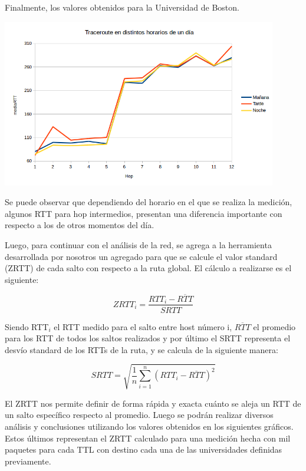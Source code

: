 Finalmente, los valores obtenidos para la Universidad de Boston. 

\centerline{\includegraphics[width=0.9\textwidth]{imagenes/1ra_parte/trace_distintos_horarios_eeuu.png}}

Se puede observar que dependiendo del horario en el que se realiza la medición, algunos RTT para hop intermedios, presentan una diferencia importante con respecto a los de otros momentos del día. 


Luego, para continuar con el análisis de la red, se agrega a la herramienta desarrollada por nosotros un agregado para que se calcule el valor standard (ZRTT) de cada salto con respecto a la ruta global. El cálculo a realizarse es el siguiente:

 \begin{equation}
 	ZRTT_i = \frac{RTT_i - \overline{RTT}}{SRTT} 
 \end{equation}

 Siendo RTT$_{i}$ el RTT medido para el salto entre host número i, $\overline{RTT}$ el promedio para los RTT de todos los saltos realizados y por último el SRTT representa el desvío standard de los RTTs de la ruta, y se calcula de la siguiente manera:

\begin{equation}
 	SRTT = \sqrt{\frac{1}{n} \sum_{i=1}^{n} (RTT_i - \overline{RTT})^2}
 \end{equation}

El ZRTT nos permite definir de forma rápida y exacta cuánto se aleja un RTT de un salto específico respecto al promedio. Luego se podrán realizar diversos análisis y conclusiones utilizando los valores obtenidos en los siguientes gráficos. Estos últimos representan el ZRTT calculado para una medición hecha con mil paquetes para cada TTL con destino cada una de las universidades definidas previamente. 

